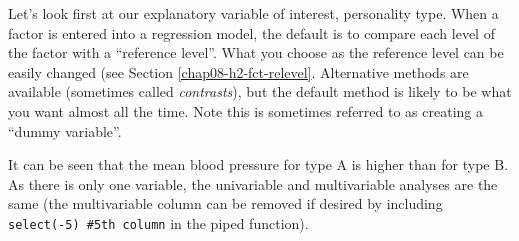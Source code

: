\documentclass[
  12pt,
  krantz2]{krantz}
\begin{document}

\begin{table}[!h]

\caption{\label{tab:unnamed-chunk-25}Linear regression: Systolic blood pressure by personality type.}
\centering
{}
\end{table}

\begin{table}[!h]

\caption{\label{tab:unnamed-chunk-25}Model metrics: Systolic blood pressure by personality type.}
\centering
{}
\end{table}

Let's look first at our explanatory variable of interest, personality type.
When a factor is entered into a regression model, the default is to compare each level of the factor with a ``reference level''.
What you choose as the reference level can be easily changed (see Section \ref{chap08-h2-fct-relevel}.
Alternative methods are available (sometimes called \emph{contrasts}), but the default method is likely to be what you want almost all the time.
Note this is sometimes referred to as creating a ``dummy variable''.

It can be seen that the mean blood pressure for type A is higher than for type B.
As there is only one variable, the univariable and multivariable analyses are the same (the multivariable column can be removed if desired by including \texttt{select(-5)\ \#5th\ column} in the piped function).
\end{document}
